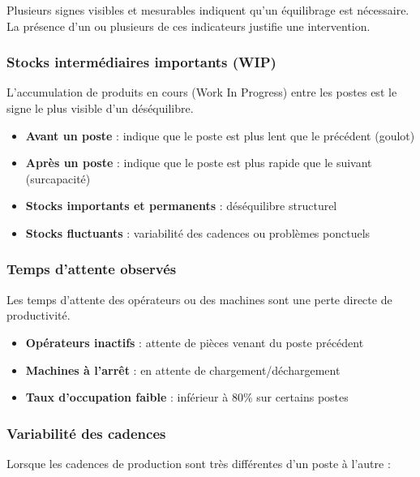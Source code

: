 \documentclass[12pt,a4paper]{article}
\newenvironment{methodbox}[1]
  {\begin{tcolorbox}[colback=blue!5!white, colframe=methodcolor, title=#1]\small}
  {\end{tcolorbox}}
\begin{document}
Plusieurs signes visibles et mesurables indiquent qu'un équilibrage est nécessaire. La présence d'un ou plusieurs de ces indicateurs justifie une intervention.

\subsubsection{Stocks intermédiaires importants (WIP)}

L'accumulation de produits en cours (Work In Progress) entre les postes est le signe le plus visible d'un déséquilibre.

\begin{methodbox}{Observation des stocks WIP}
\begin{itemize}
    \item \textbf{Avant un poste} : indique que le poste est plus lent que le précédent (goulot)
    \item \textbf{Après un poste} : indique que le poste est plus rapide que le suivant (surcapacité)
    \item \textbf{Stocks importants et permanents} : déséquilibre structurel
    \item \textbf{Stocks fluctuants} : variabilité des cadences ou problèmes ponctuels
\end{itemize}
\end{methodbox}

\subsubsection{Temps d'attente observés}

Les temps d'attente des opérateurs ou des machines sont une perte directe de productivité.

\begin{itemize}
    \item \textbf{Opérateurs inactifs} : attente de pièces venant du poste précédent
    \item \textbf{Machines à l'arrêt} : en attente de chargement/déchargement
    \item \textbf{Taux d'occupation faible} : inférieur à 80\% sur certains postes
\end{itemize}

\subsubsection{Variabilité des cadences}

Lorsque les cadences de production sont très différentes d'un poste à l'autre :
\end{document}
